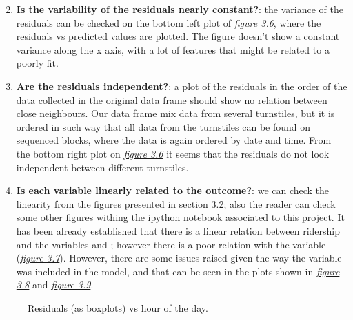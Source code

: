 \documentclass[a4paper,12pt,english]{sphinxmanual}
\begin{document}
\begin{enumerate}
\setcounter{enumi}{1}
\item {} 
\textbf{Is the variability of the residuals nearly constant?}: the variance of the
residuals can be checked on the bottom left plot of {\hyperref[section2:figure36]{\emph{figure 3.6}}},
where the residuals vs predicted values are plotted. The figure doesn't show
a constant variance along the x axis, with a lot of features that might be
related to a poorly fit.

\item {} 
\textbf{Are the residuals independent?}: a plot of the residuals in the order of the
data collected in the original data frame should show no relation between
close neighbours. Our data frame mix data from several turnstiles, but it is
ordered in such way that all data from the turnstiles can be found on sequenced
blocks, where the data is again ordered by date and time. From the bottom right
plot on {\hyperref[section2:figure36]{\emph{figure 3.6}}} it seems that the residuals do not look
independent between different turnstiles.

\item {} 
\textbf{Is each variable linearly related to the outcome?}: we can check the linearity
from the figures presented in section 3.2; also the reader can check some
other figures withing the ipython notebook associated to this project. It has
been already established that there is a linear relation between ridership and
the variables  and ; however there is a poor relation with
the  variable ({\hyperref[section2:figure37]{\emph{figure 3.7}}}). However, there are some
issues raised given the way the  variable was included in the model,
and that can be seen in the plots shown in {\hyperref[section2:figure37]{\emph{figure 3.8}}}
and {\hyperref[section2:figure39]{\emph{figure 3.9}}}.

\end{enumerate}
\begin{figure}[htbp]
\centering
\capstart

\caption{Residuals (as boxplots) vs hour of the day.}\label{section2:figure37}\end{figure}
\end{document}
